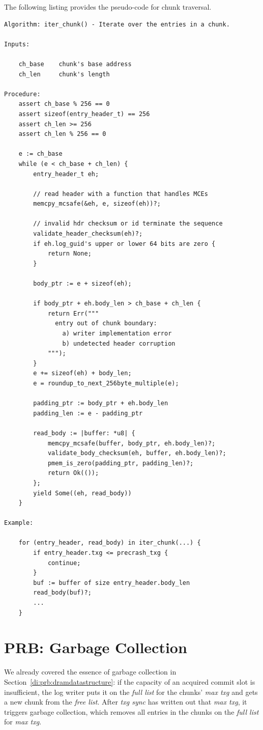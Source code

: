 \documentclass[12pt,a4paper,twoside]{book}
\begin{document}
The following listing provides the pseudo-code for chunk traversal.
\begin{lstlisting}[style=figurepseudocode]
Algorithm: iter_chunk() - Iterate over the entries in a chunk.

Inputs:

    ch_base    chunk's base address
    ch_len     chunk's length

Procedure:
    assert ch_base % 256 == 0
    assert sizeof(entry_header_t) == 256
    assert ch_len >= 256
    assert ch_len % 256 == 0

    e := ch_base
    while (e < ch_base + ch_len) {
        entry_header_t eh;

        // read header with a function that handles MCEs
        memcpy_mcsafe(&eh, e, sizeof(eh))?;

        // invalid hdr checksum or id terminate the sequence
        validate_header_checksum(eh)?;
        if eh.log_guid's upper or lower 64 bits are zero {
            return None;
        }

        body_ptr := e + sizeof(eh);

        if body_ptr + eh.body_len > ch_base + ch_len {
            return Err("""
              entry out of chunk boundary:
                a) writer implementation error
                b) undetected header corruption
            """);
        }
        e += sizeof(eh) + body_len;
        e = roundup_to_next_256byte_multiple(e);

        padding_ptr := body_ptr + eh.body_len
        padding_len := e - padding_ptr

        read_body := |buffer: *u8| {
            memcpy_mcsafe(buffer, body_ptr, eh.body_len)?;
            validate_body_checksum(eh, buffer, eh.body_len)?;
            pmem_is_zero(padding_ptr, padding_len)?;
            return Ok(());
        };
        yield Some((eh, read_body))
    }

Example:

    for (entry_header, read_body) in iter_chunk(...) {
        if entry_header.txg <= precrash_txg {
            continue;
        }
        buf := buffer of size entry_header.body_len
        read_body(buf)?;
        ...
    }
\end{lstlisting}

\section{PRB: Garbage Collection}\label{di:prb:gc}
We already covered the essence of garbage collection in Section~\ref{di:prb:dramdatastructure}:
if the capacity of an acquired commit slot is insufficient, the log writer puts it on the \textit{full list} for the chunks' \textit{max txg} and gets a new chunk from the \textit{free list}.
After \textit{txg sync} has written out that \textit{max txg}, it triggers garbage collection, which removes all entries in the chunks on the \textit{full list} for \textit{max txg}.
\end{document}
